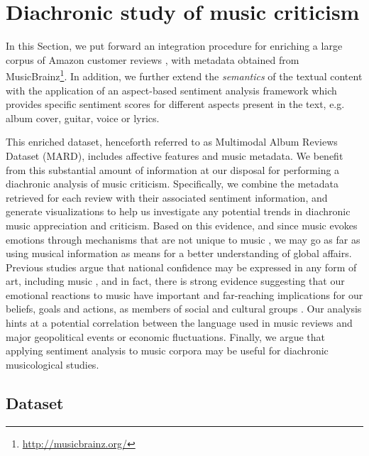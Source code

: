 \section{Diachronic study of music criticism}
\label{sec:musicology:evolution}

In this Section, we put forward an integration procedure for enriching a large corpus of Amazon customer reviews \citep{McAuley2015a,McAuley2015}, with metadata obtained from MusicBrainz\footnote{\url{http://musicbrainz.org/}}. %
In addition, we further extend the \textit{semantics} of the textual content with the application of an aspect-based sentiment analysis framework \citep{DongSOS13} which provides specific sentiment scores for different aspects present in the text, e.g. album cover, guitar, voice or lyrics.

This enriched dataset, henceforth referred to as Multimodal Album Reviews Dataset (MARD), includes affective features and music metadata. %
We benefit from this substantial amount of information at our disposal for performing a diachronic analysis of music criticism. Specifically, we combine the metadata retrieved for each review with their associated sentiment information, and generate visualizations to help us investigate any potential trends in diachronic music appreciation and criticism. Based on this evidence, and since music evokes emotions through mechanisms that are not unique to music \citep{Juslin2008}, we may go as far as using musical information as means for a better understanding of global affairs. Previous studies argue that national confidence may be expressed in any form of art, including music \citep{Moisi2010}, and in fact, there is strong evidence suggesting that our emotional reactions to music have important and far-reaching implications for our beliefs, goals and actions, as members of social and cultural groups \citep{Alcorta2008}. Our analysis hints at a potential correlation between the language used in music reviews and major geopolitical events or economic fluctuations. Finally, we argue that applying sentiment analysis to music corpora may be useful for diachronic musicological studies.


\subsection{Dataset}
\label{sec:musicology:mard}

